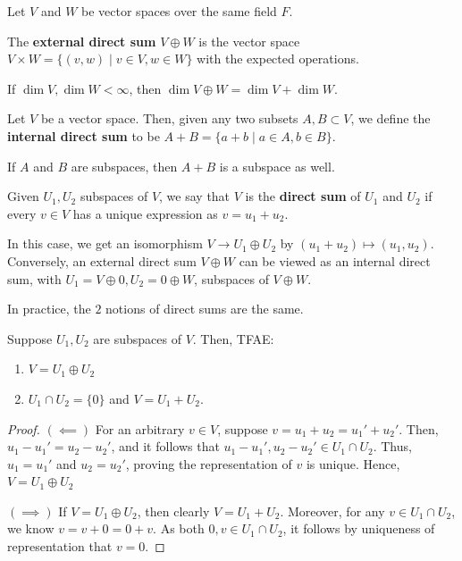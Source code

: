 Let $V$ and $W$ be vector spaces over the same field $F$.

\begin{defn}
    The \textbf{external direct sum} $V \oplus W$ is the vector space $V \times W = \{(v,w)\mid v \in V,w \in W\}$ with the expected operations.
\end{defn}

\begin{thm}
    If $\dim V,\dim W < \infty$, then $\dim V \oplus W= \dim V + \dim W$.
\end{thm}

\begin{defn}
    Let $V$ be a vector space. Then, given any two subsets $A ,B \subset V$, we define the \textbf{internal direct sum} to be $A+B = \{a+b \mid a \in A,b \in B\}$.

    If $A$ and $B$ are subspaces, then $A+B$ is a subspace as well.
\end{defn}

\begin{defn}
    Given $U_1,U_2$ subspaces of $V$, we say that $V$ is the \textbf{direct sum} of $U_1$ and $U_2$ if every $v \in V$ has a unique expression as $v=u_1+u_2$.

    In this case, we get an isomorphism $V \to U_1 \oplus U_2$ by $(u_1+u_2) \mapsto (u_1,u_2)$. Conversely, an external direct sum $V \oplus W$ can be viewed as an internal direct sum, with $U_1 = V \oplus 0,U_2=0 \oplus W$, subspaces of $V\oplus W$.
\end{defn}

In practice, the $2$ notions of direct sums are the same.

\begin{prop}
    Suppose $U_1,U_2$ are subspaces of $V$. Then, TFAE:
    \begin{enumerate}
        \item $V = U_1 \oplus U_2$
        \item $U_1 \cap U_2 = \{0\}$ and $V=U_1+U_2$.
    \end{enumerate}
\end{prop}

\begin{proof}
    \hfill

    $(\impliedby)$ For an arbitrary $v \in V$, suppose $v=u_1+u_2=u_1'+u_2'$. Then, $u_1-u_1'=u_2-u_2'$, and it follows that $u_1-u_1',u_2-u_2' \in U_1 \cap U_2$. Thus, $u_1=u_1'$ and $u_2=u_2'$, proving the representation of $v$ is unique. Hence, $V = U_1 \oplus U_2$

    $(\implies)$ If $V = U_1 \oplus U_2$, then clearly $V=U_1+U_2$. Moreover, for any $v \in U_1 \cap U_2$, we know $v =v+0=0+v$. As both $0,v \in U_1 \cap U_2$, it follows by uniqueness of representation that $v=0$.
\end{proof}

